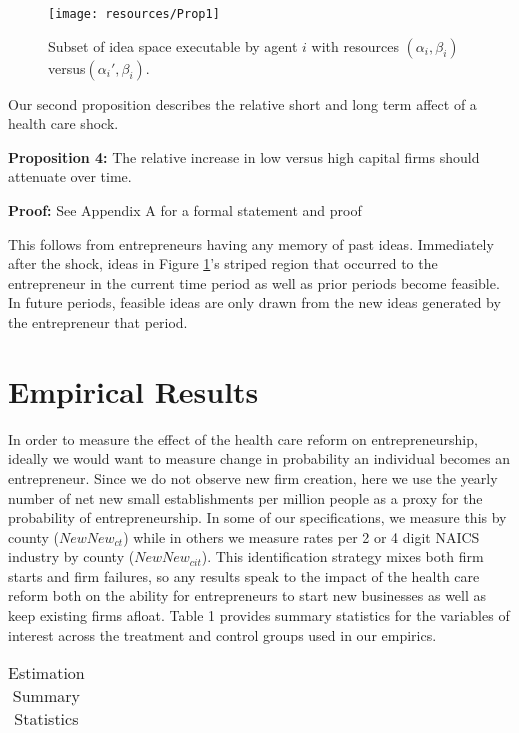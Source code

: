 \documentclass[12pt]{article}
\begin{document}
\begin{figure}[H]
	\centering
	\texttt{[image: resources/Prop1]}
	\caption{Subset of idea space executable by agent $i$ with resources $(\alpha_i,\beta_i)$ versus$(\alpha_i', \beta_i)$.}
	\label{fig:ideaSpace}
\end{figure}

Our second proposition describes the relative short and long term affect of a health care shock. 

\textbf{Proposition 4:} The relative increase in low versus high capital firms should attenuate over time. 

\textbf{Proof:} See Appendix A for a formal statement and proof

This follows from entrepreneurs having any memory of past ideas. Immediately after the shock, ideas in Figure \ref{fig:ideaSpace}'s striped region that occurred to the entrepreneur in the current time period as well as prior periods become feasible. In future periods, feasible ideas are only drawn from the new ideas generated by the entrepreneur that period.

\section{Empirical Results}
In order to measure the effect of the health care reform on entrepreneurship, ideally we would want to measure change in probability an individual becomes an entrepreneur. Since we do not observe new firm creation, here we use the yearly number of net new small establishments per million people as a proxy for the probability of entrepreneurship. In some of our specifications, we measure this by county ($NewNew_{ct}$) while in others we measure rates per 2 or 4 digit NAICS industry by county ($NewNew_{cit}$). This identification strategy mixes both firm starts and firm failures, so any results speak to the impact of the health care reform both on the ability for entrepreneurs to start new businesses as well as keep existing firms afloat. Table 1 provides summary statistics for the variables of interest across the treatment and control groups used in our empirics. 
\begin{flushleft}
\begin{table}[H]
	\centering
	\begin{tabular}{|p{6cm} | r | r| r| r|r|}
	\hline
	
	\hline
	\end{tabular}
	\caption{Estimation Summary Statistics}
\end{table}
\end{flushleft}
\end{document}
